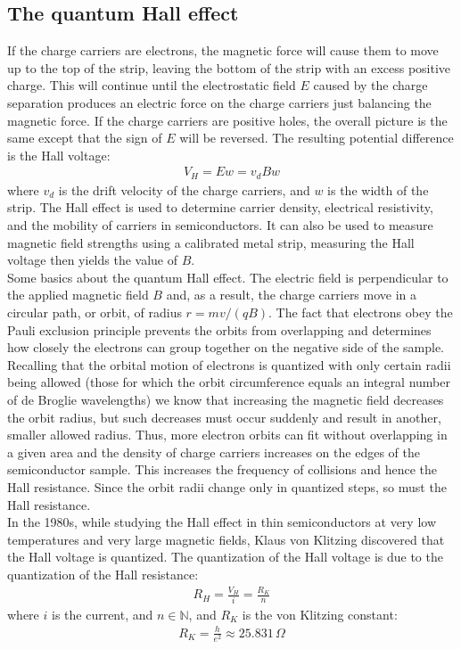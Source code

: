 \documentclass[11pt]{article}
\theoremstyle{break}
\theoremstyle{break}
\newcommand{\N}{\mathbb{N}}
\begin{document}
\subsection{The quantum Hall effect}
If the charge carriers are electrons, the magnetic force will cause them to move up to the top of the strip, leaving the bottom of the strip with an excess positive charge. This will continue until the electrostatic field $E$ caused by the charge separation produces an electric force on the charge carriers just balancing the magnetic force.
If the charge carriers are positive holes, the overall picture is the same except that the sign of $E$ will be reversed. The resulting potential difference is the Hall voltage:
\begin{align*}
V_H = Ew = v_d B w
\end{align*}
where $v_d$ is the drift velocity of the charge carriers, and $w$ is the width of the strip. The Hall effect is used to determine carrier density, electrical resistivity, and the mobility of carriers in semiconductors.
It can also be used to measure magnetic field strengths using a calibrated metal strip, measuring the Hall voltage then yields the value of $B$.\\

Some basics about the quantum Hall effect. The electric field is perpendicular
to the applied magnetic field $B$ and, as a result, the charge carriers move in a circular path, or orbit, of radius $r = mv/(qB)$. The fact that electrons obey the Pauli exclusion principle prevents
the orbits from overlapping and determines how closely the electrons can group together on the negative side of the sample. Recalling that the orbital motion of electrons is quantized with only certain radii being allowed (those for which the orbit circumference equals an integral number of de Broglie wavelengths) we know that increasing the magnetic field decreases the orbit radius, but such decreases must occur suddenly and result in another, smaller allowed radius. Thus, more electron orbits can fit without overlapping in a given area and the density of charge carriers increases on the edges of the semiconductor sample. This increases the frequency of collisions and hence the Hall resistance. Since the orbit radii change only in quantized steps, so must the
Hall resistance. \\

In the 1980s, while studying the Hall effect in thin semiconductors at very low temperatures and very large magnetic fields, Klaus von Klitzing discovered that the Hall voltage is quantized. The quantization of the Hall voltage is due to the quantization of the Hall resistance:
\begin{align*}
R_H = \frac{V_H}{i} = \frac{R_K}{n}
\end{align*}
where $i$ is the current, and $n\in \N$, and $R_K$ is the von Klitzing constant:
\begin{align*}
R_K = \frac{h}{e^2} \approx 25.831\, \Omega
\end{align*}
\end{document}
